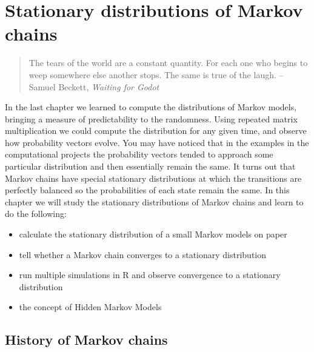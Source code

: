 \documentclass[
  letterpaper,
  DIV=11,
  numbers=noendperiod]{scrreprt}
\providecommand{\tightlist}{%
  \setlength{\itemsep}{0pt}\setlength{\parskip}{0pt}}\usepackage{longtable,booktabs,array}
\begin{document}

\hypertarget{stationary-distributions-of-markov-chains}{%
\chapter{Stationary distributions of Markov
chains}\label{stationary-distributions-of-markov-chains}}

\begin{quote}
The tears of the world are a constant quantity. For each one who begins
to weep somewhere else another stops. The same is true of the laugh. --
Samuel Beckett, \emph{Waiting for Godot}
\end{quote}

In the last chapter we learned to compute the distributions of Markov
models, bringing a measure of predictability to the randomness. Using
repeated matrix multiplication we could compute the distribution for any
given time, and observe how probability vectors evolve. You may have
noticed that in the examples in the computational projects the
probability vectors tended to approach some particular distribution and
then essentially remain the same. It turns out that Markov chains have
special stationary distributions at which the transitions are perfectly
balanced so the probabilities of each state remain the same. In this
chapter we will study the stationary distributions of Markov chains and
learn to do the following:

\begin{itemize}
\tightlist
\item
  calculate the stationary distribution of a small Markov models on
  paper
\item
  tell whether a Markov chain converges to a stationary distribution
\item
  run multiple simulations in R and observe convergence to a stationary
  distribution
\item
  the concept of Hidden Markov Models
\end{itemize}

\hypertarget{history-of-markov-chains}{%
\section{History of Markov chains}\label{history-of-markov-chains}}
\end{document}
